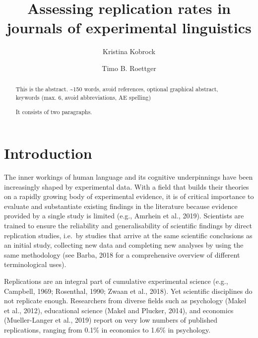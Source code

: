 \documentclass[]{elsarticle} %
\begin{document}
\begin{frontmatter}

  \title{Assessing replication rates in journals of experimental linguistics}
    \author[University of Osnabrück]{Kristina Kobrock}
    \author[Universitetet i Oslo]{Timo B. Roettger}
  
      \address[University of Osnabrück]{Institute of Cognitive Science, Wachsbleiche 27, 49090 Osnabrück}
    \address[Universitetet i Oslo]{Department of Linguistics and Scandinavian Studies}
  
  \begin{abstract}
  This is the abstract. \textasciitilde150 words, avoid references, optional graphical abstract, keywords (max. 6, avoid abbreviations, AE spelling)

  It consists of two paragraphs.
  \end{abstract}
  
 \end{frontmatter}

\hypertarget{introduction}{%
\section{Introduction}\label{introduction}}

The inner workings of human language and its cognitive underpinnings have been increasingly shaped by experimental data. With a field that builds their theories on a rapidly growing body of experimental evidence, it is of critical importance to evaluate and substantiate existing findings in the literature because evidence provided by a single study is limited (e.g., Amrhein et al., 2019). Scientists are trained to ensure the reliability and generalisability of scientific findings by direct replication studies, i.e.~by studies that arrive at the same scientific conclusions as an initial study, collecting new data and completing new analyses by using the same methodology (see Barba, 2018 for a comprehensive overview of different terminological uses).

Replications are an integral part of cumulative experimental science (e.g., Campbell, 1969; Rosenthal, 1990; Zwaan et al., 2018). Yet scientific disciplines do not replicate enough. Researchers from diverse fields such as psychology (Makel et al., 2012), educational science (Makel and Plucker, 2014), and economics (Mueller-Langer et al., 2019) report on very low numbers of published replications, ranging from 0.1\% in economics to 1.6\% in psychology.
\end{document}
